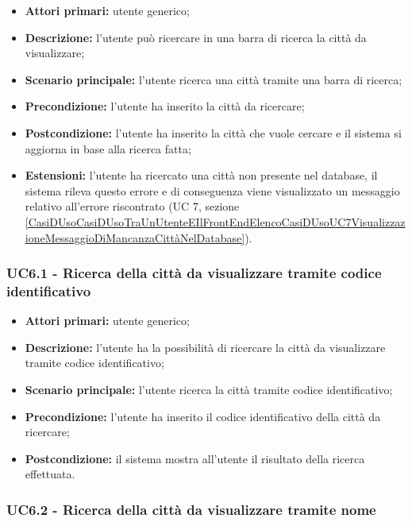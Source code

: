 \begin{itemize}
	\item \textbf{Attori primari:} utente generico;
	\item \textbf{Descrizione:} l’utente può ricercare in una barra di ricerca la città da visualizzare;
	\item \textbf{Scenario principale:} l’utente ricerca una città tramite una barra di ricerca;
	\item \textbf{Precondizione:} l’utente ha inserito la città da ricercare;
	\item \textbf{Postcondizione:} l’utente ha inserito la città che vuole cercare e il sistema si aggiorna in base alla ricerca fatta;
	\item \textbf{Estensioni:} l’utente ha ricercato una città non presente nel database, il sistema rileva questo errore e di conseguenza viene visualizzato un messaggio relativo all’errore riscontrato (UC 7, sezione \ref{CasiDUsoCasiDUsoTraUnUtenteEIlFrontEndElencoCasiDUsoUC7VisualizzazioneMessaggioDiMancanzaCittàNelDatabase}).
\end{itemize}

\subsubsection{UC6.1 - Ricerca della città da visualizzare tramite codice identificativo}\label{CasiDUsoCasiDUsoTraUnUtenteEIlFrontEndElencoCasiDUsoUC61RicercaDellaCittàDaVisualizzareTramiteCodiceIdentificativo}

\begin{itemize}
	\item \textbf{Attori primari:} utente generico;
	\item \textbf{Descrizione:} l’utente ha la possibilità di ricercare la città da visualizzare tramite codice identificativo;
	\item \textbf{Scenario principale:} l’utente ricerca la città tramite codice identificativo;
	\item \textbf{Precondizione:} l’utente ha inserito il codice identificativo della città da ricercare;
	\item \textbf{Postcondizione:} il sistema mostra all’utente il risultato della ricerca effettuata.
\end{itemize}

\subsubsection{UC6.2 - Ricerca della città da visualizzare tramite nome}\label{CasiDUsoCasiDUsoTraUnUtenteEIlFrontEndElencoCasiDUsoUC52RicercaDellaCittàDaVisualizzareTramiteNome}

